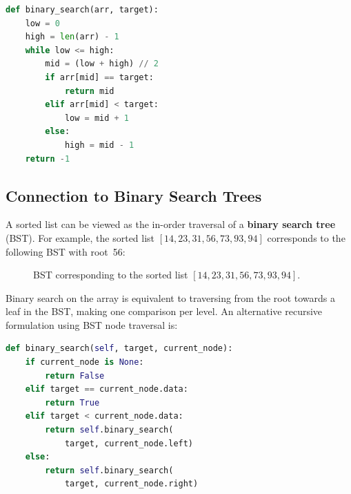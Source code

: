 \documentclass[11pt, a4paper, notitlepage]{report}
\theoremstyle{definition}
\theoremstyle{remark}
\theoremstyle{definition}
\begin{document}
\begin{lstlisting}[language=Python]
def binary_search(arr, target):
    low = 0
    high = len(arr) - 1
    while low <= high:
        mid = (low + high) // 2
        if arr[mid] == target:
            return mid
        elif arr[mid] < target:
            low = mid + 1
        else:
            high = mid - 1
    return -1
\end{lstlisting}

\subsection{Connection to Binary Search Trees}
\label{subsec:binsearch-bst}

A sorted list can be viewed as the in-order traversal of a \textbf{binary
search tree} (BST).  For example, the sorted list $[14, 23, 31, 56, 73, 93, 94]$
corresponds to the following BST with root~56:

\begin{figure}[h]
\centering
{}
\caption{BST corresponding to the sorted list $[14,23,31,56,73,93,94]$.}
\label{fig:bst-sorted}
\end{figure}

Binary search on the array is equivalent to traversing from the root towards a
leaf in the BST, making one comparison per level.  An alternative recursive
formulation using BST node traversal is:

\begin{lstlisting}[language=Python]
def binary_search(self, target, current_node):
    if current_node is None:
        return False
    elif target == current_node.data:
        return True
    elif target < current_node.data:
        return self.binary_search(
            target, current_node.left)
    else:
        return self.binary_search(
            target, current_node.right)
\end{lstlisting}
\end{document}
